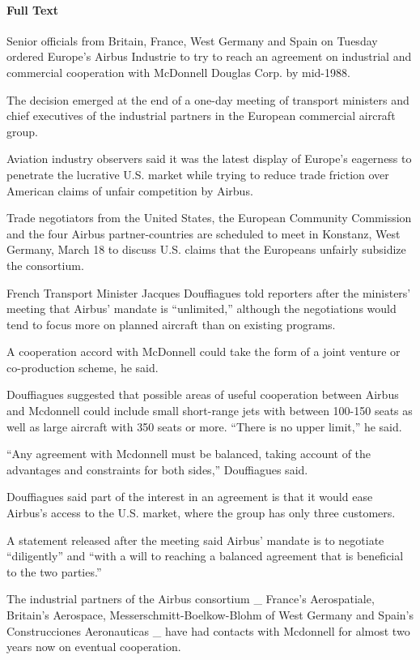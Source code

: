 \documentclass{mprop}
\begin{document}
\paragraph{Full Text}
Senior officials from Britain, France, West Germany
and Spain on Tuesday ordered Europe's Airbus Industrie to try to
reach an agreement on industrial and commercial cooperation with
McDonnell Douglas Corp. by mid-1988.
   
The decision emerged at the end of a one-day meeting of
transport ministers and chief executives of the industrial partners
in the European commercial aircraft group.

Aviation industry observers said it was the latest display of
Europe's eagerness to penetrate the lucrative U.S. market while
trying to reduce trade friction over American claims of unfair
competition by Airbus.
   
Trade negotiators from the United States, the European Community
Commission and the four Airbus partner-countries are scheduled to
meet in Konstanz, West Germany, March 18 to discuss U.S. claims
that the Europeans unfairly subsidize the consortium.
   
French Transport Minister Jacques Douffiagues told reporters
after the ministers' meeting that Airbus' mandate is ``unlimited,''
although the negotiations would tend to focus more on planned
aircraft than on existing programs.
   
A cooperation accord with McDonnell could take the form of a
joint venture or co-production scheme, he said.
   
Douffiagues suggested that possible areas of useful cooperation
between Airbus and Mcdonnell could include small short-range jets
with between 100-150 seats as well as large aircraft with 350 seats
or more. ``There is no upper limit,'' he said.
   
``Any agreement with Mcdonnell must be balanced, taking account
of the advantages and constraints for both sides,'' Douffiagues
said.
   
Douffiagues said part of the interest in an agreement is that it
would ease Airbus's access to the U.S. market, where the group has
only three customers.
   
A statement released after the meeting said Airbus' mandate is
to negotiate ``diligently'' and ``with a will to reaching a
balanced agreement that is beneficial to the two parties.''
   
The industrial partners of the Airbus consortium \_ France's
Aerospatiale, Britain's Aerospace, Messerschmitt-Boelkow-Blohm of
West Germany and Spain's Construcciones Aeronauticas \_ have had
contacts with Mcdonnell for almost two years now on eventual
cooperation.
   
\end{document}
